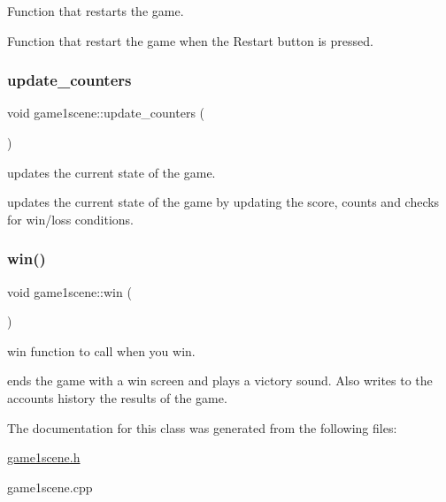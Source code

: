 Function that restarts the game. 

Function that restart the game when the Restart button is pressed. \mbox{\label{classgame1scene_a4e66bd7b75ee140431a9ae8f9fa40000}} 
\subsubsection{\texorpdfstring{update\+\_\+counters}{update\_counters}}
{\footnotesize\ttfamily void game1scene\+::update\+\_\+counters (\begin{DoxyParamCaption}{ }\end{DoxyParamCaption})\hspace{0.3cm}{\ttfamily [slot]}}



updates the current state of the game. 

updates the current state of the game by updating the score, counts and checks for win/loss conditions. \mbox{\label{classgame1scene_a760917f4ad49e991bba784f16a468f98}} 
\subsubsection{\texorpdfstring{win()}{win()}}
{\footnotesize\ttfamily void game1scene\+::win (\begin{DoxyParamCaption}{ }\end{DoxyParamCaption})}



win function to call when you win. 

ends the game with a win screen and plays a victory sound. Also writes to the account\textquotesingle{}s history the results of the game. 

The documentation for this class was generated from the following files\+:\begin{DoxyCompactItemize}
\item 
\hyperlink{game1scene_8h}{game1scene.\+h}\item 
game1scene.\+cpp\end{DoxyCompactItemize}
